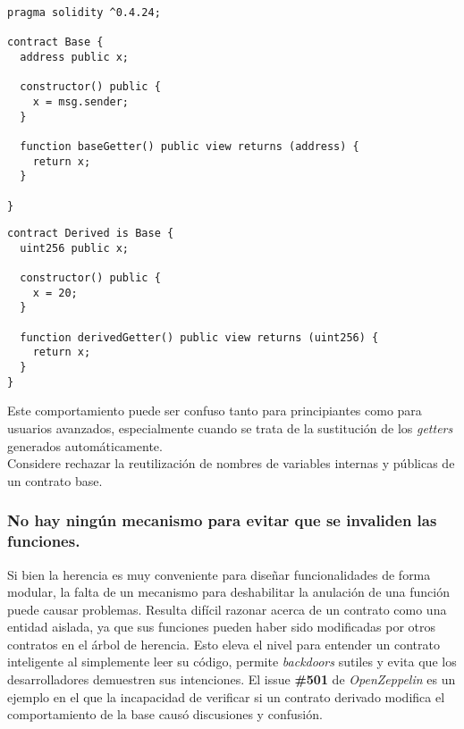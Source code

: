 \begin{lstlisting}[language=Solidity, caption={Código de ejemplo, contrato Base}]
pragma solidity ^0.4.24;

contract Base {
  address public x;

  constructor() public {
    x = msg.sender;
  }

  function baseGetter() public view returns (address) {
    return x;
  }

}
\end{lstlisting}

\begin{lstlisting}[language=Solidity, caption={Código de ejemplo contrato Derived}]
contract Derived is Base {
  uint256 public x;

  constructor() public {
    x = 20;
  }

  function derivedGetter() public view returns (uint256) {
    return x;
  }
}
\end{lstlisting}

Este comportamiento puede ser confuso tanto para principiantes como para usuarios avanzados, especialmente cuando se trata de la sustitución de los \textit{getters} generados automáticamente.\\

Considere rechazar la reutilización de nombres de variables internas y públicas de un contrato base.\\

\subsubsection{No hay ningún mecanismo para evitar que se invaliden las funciones.}

Si bien la herencia es muy conveniente para diseñar funcionalidades de forma modular, la falta de un mecanismo para deshabilitar la anulación de una función puede causar problemas. Resulta difícil razonar acerca de un contrato como una entidad aislada, ya que sus funciones pueden haber sido modificadas por otros contratos en el árbol de herencia. Esto eleva el nivel para entender un contrato inteligente al simplemente leer su código, permite \textit{backdoors} sutiles y evita que los desarrolladores demuestren sus intenciones. El issue \textbf{\#501}\cite{OpenZeppelinIssue501} de \textit{OpenZeppelin} es un ejemplo en el que la incapacidad de verificar si un contrato derivado modifica el comportamiento de la base causó discusiones y confusión.\\


